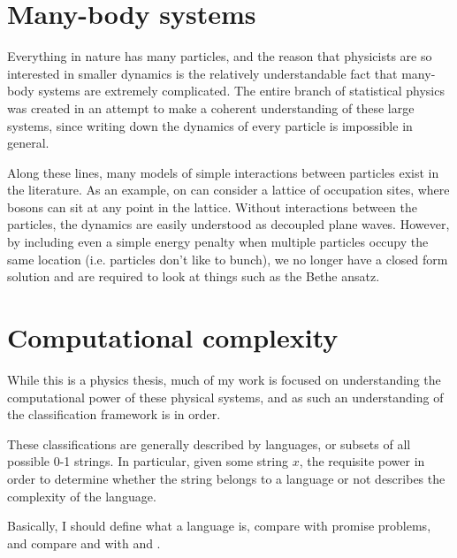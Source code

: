 \documentclass[../thesis-main/thesis-main]{subfiles}
\begin{document}

\section{Many-body systems}

Everything in nature has many particles, and the reason that physicists are so interested in smaller dynamics is the relatively understandable fact that many-body systems are extremely complicated.  The entire branch of statistical physics was created in an attempt to make a coherent understanding of these large systems, since writing down the dynamics of every particle is impossible in general.  

Along these lines, many models of simple interactions between particles exist in the literature.  As an example, on can consider a lattice of occupation sites, where bosons can sit at any point in the lattice.  Without interactions between the particles, the dynamics are easily understood as decoupled plane waves.  However, by including even a simple energy penalty when multiple particles occupy the same location (i.e. particles don't like to bunch), we no longer have a closed form solution and are required to look at things such as the Bethe ansatz.  


\section{Computational complexity}

While this is a physics thesis, much of my work is focused on understanding the computational power of these physical systems, and as such an understanding of the classification framework is in order.  

These classifications are generally described by languages, or subsets of all possible 0-1 strings.  In particular, given some string $x$, the requisite power in order to determine whether the string belongs to a language or not describes the complexity of the language.  

Basically, I should define what a language is, compare with promise problems, and compare \PP and \NP  with \BQP  and \QMA .
\end{document}
